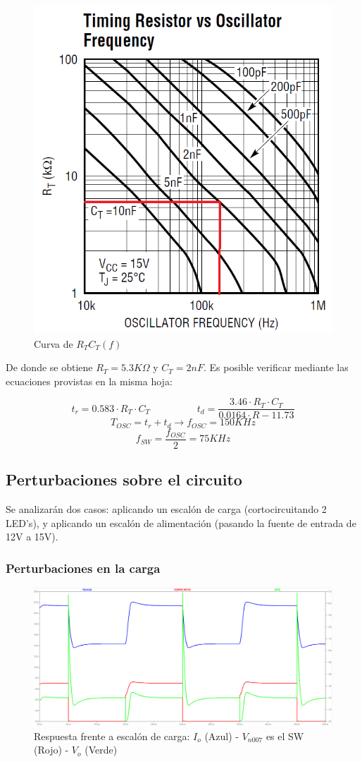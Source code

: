 \documentclass[e4_tp2_main.tex]{subfiles}
\begin{document}
\begin{figure}[H]
\centering
\includegraphics[width=0.3\linewidth]{Imagenes/Punto2/RT-OSC.png}
\caption{Curva de $R_TC_T(f)$}
\end{figure}

De donde se obtiene $R_T = 5.3K\Omega$ y $C_T = 2nF$. Es posible verificar mediante las ecuaciones provistas en la misma hoja:

\[
t_r = 0.583 \cdot R_T \cdot C_T \hspace{2cm} t_d = \frac{3.46 \cdot R_T \cdot C_T}{0.0164 \cdot R - 11.73}
\]
\[
T_{OSC} = t_r + t_d \longrightarrow f_{OSC} = 150KHz
\]
\[
f_{SW} = \frac{f_{OSC}}{2} = 75KHz
\]

\subsection*{Perturbaciones sobre el circuito}
Se analizarán dos casos: aplicando un escalón de carga (cortocircuitando 2 LED's), y aplicando un escalón de alimentación (pasando la fuente de entrada de 12V a 15V).
\subsubsection*{Perturbaciones en la carga}
\begin{figure}[H]
\centering
\includegraphics[width=0.7\linewidth]{Imagenes/Punto2/cargavariable-I-V.png}
\caption{Respuesta frente a escalón de carga: $I_o$ (Azul) - $V_{n007}$ es el SW (Rojo) - $V_o$ (Verde)}
\end{figure}
\end{document}
